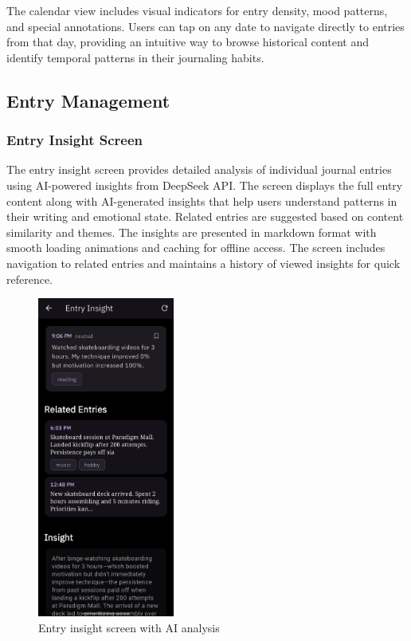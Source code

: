 The calendar view includes visual indicators for entry density, mood patterns, and special annotations. Users can tap on any date to navigate directly to entries from that day, providing an intuitive way to browse historical content and identify temporal patterns in their journaling habits.

\subsection{Entry Management}

\subsubsection{Entry Insight Screen}

The entry insight screen provides detailed analysis of individual journal entries using AI-powered insights from DeepSeek API. The screen displays the full entry content along with AI-generated insights that help users understand patterns in their writing and emotional state. Related entries are suggested based on content similarity and themes. The insights are presented in markdown format with smooth loading animations and caching for offline access. The screen includes navigation to related entries and maintains a history of viewed insights for quick reference.

\begin{samepage}
\begin{figure}[H]
\centering
\includegraphics[width=0.4\textwidth]{files/imgs/prototype/entry_insight_screen.jpeg}
\caption{Entry insight screen with AI analysis}
\label{fig:entry-insight-screen}
\end{figure}
\end{samepage}


